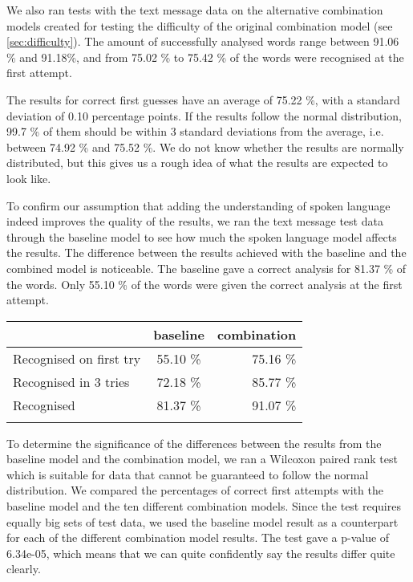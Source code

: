 \documentclass[a4paper,conference]{IEEEtran}
\begin{document}
We also ran tests with the text message data on the alternative combination models created for testing the difficulty of the original combination model (see \ref{sec:difficulty}). The amount of successfully analysed words range between 91.06 \% and 91.18\%, and from 75.02 \% to 75.42 \% of the words were recognised at the first attempt. 

The results for correct first guesses have an average of 75.22 \%, with a standard deviation of 0.10 percentage points. If the results follow the normal distribution, 99.7 \% of them should be within 3 standard deviations from the average, i.e. between 74.92 \% and 75.52 \%. We do not know whether the results are normally distributed, but this gives us a rough idea of what the results are expected to look like.

To confirm our assumption that adding the understanding of spoken language indeed improves the quality of the results, we ran the text message test data through the baseline model to see how much the spoken language model affects the results. The difference between the results achieved with the baseline and the combined model is noticeable. The baseline gave a correct analysis for 81.37 \% of the words. Only 55.10 \% of the words were given the correct analysis at the first attempt.

\begin{tabular} {l c r}
 & baseline & combination \\
 \hline
Recognised on first try & 55.10 \% & 75.16 \% \\
Recognised in 3 tries & 72.18 \% & 85.77 \% \\
Recognised & 81.37 \% & 91.07 \% \\
\hline
 & & \\
\end{tabular}


To determine the significance of the differences between the results from the baseline model and the combination model, we ran a Wilcoxon paired rank test which is suitable for data that cannot be guaranteed to follow the normal distribution. We compared the percentages of correct first attempts with the baseline model and the ten different combination models. Since the test requires equally big sets of test data, we used the baseline model result as a counterpart for each of the different combination model results. The test gave a p-value of 6.34e-05, which means that we can quite confidently say the results differ quite clearly.
\end{document}

